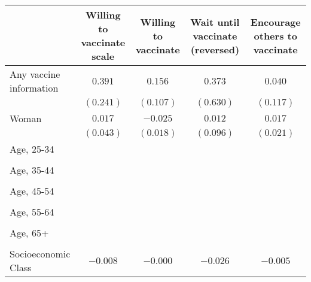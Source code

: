 \begin{table}
\begin{center}
\begin{tabular}{l c c c c}
\hline
 & Willing to vaccinate scale & Willing to vaccinate & Wait until vaccinate (reversed) & Encourage others to vaccinate \\
\hline
Any vaccine information                                   & $0.391$      & $0.156$      & $0.373$       & $0.040$   \\
                                                          & $(0.241)$    & $(0.107)$    & $(0.630)$     & $(0.117)$ \\
Woman                                                     & $0.017$      & $-0.025$     & $0.012$       & $0.017$   \\
                                                          & $(0.043)$    & $(0.018)$    & $(0.096)$     & $(0.021)$ \\
Age, 25-34                                                &              &              &               &           \\
                                                          &              &              &               &           \\
Age, 35-44                                                &              &              &               &           \\
                                                          &              &              &               &           \\
Age, 45-54                                                &              &              &               &           \\
                                                          &              &              &               &           \\
Age, 55-64                                                &              &              &               &           \\
                                                          &              &              &               &           \\
Age, 65+                                                  &              &              &               &           \\
                                                          &              &              &               &           \\
Socioeconomic Class                                       & $-0.008$     & $-0.000$     & $-0.026$      & $-0.005$  \\

\end{tabular}
\end{center}
\end{table}
